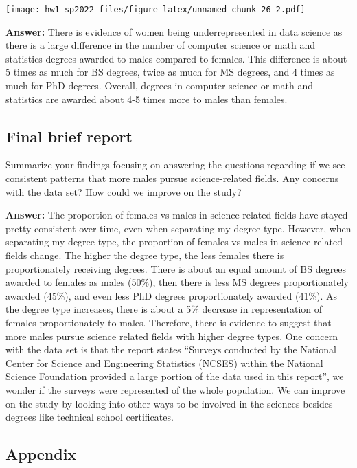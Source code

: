 \documentclass[
]{article}
\begin{document}
\texttt{[image: hw1\_sp2022\_files/figure-latex/unnamed-chunk-26-2.pdf]}

\textbf{Answer:} There is evidence of women being underrepresented in
data science as there is a large difference in the number of computer
science or math and statistics degrees awarded to males compared to
females. This difference is about 5 times as much for BS degrees, twice
as much for MS degrees, and 4 times as much for PhD degrees. Overall,
degrees in computer science or math and statistics are awarded about 4-5
times more to males than females.

\hypertarget{final-brief-report}{%
\subsection{Final brief report}\label{final-brief-report}}

Summarize your findings focusing on answering the questions regarding if
we see consistent patterns that more males pursue science-related
fields. Any concerns with the data set? How could we improve on the
study?

\textbf{Answer:} The proportion of females vs males in science-related
fields have stayed pretty consistent over time, even when separating my
degree type. However, when separating my degree type, the proportion of
females vs males in science-related fields change. The higher the degree
type, the less females there is proportionately receiving degrees. There
is about an equal amount of BS degrees awarded to females as males
(50\%), then there is less MS degrees proportionately awarded (45\%),
and even less PhD degrees proportionately awarded (41\%). As the degree
type increases, there is about a 5\% decrease in representation of
females proportionately to males. Therefore, there is evidence to
suggest that more males pursue science related fields with higher degree
types. One concern with the data set is that the report states ``Surveys
conducted by the National Center for Science and Engineering Statistics
(NCSES) within the National Science Foundation provided a large portion
of the data used in this report'', we wonder if the surveys were
represented of the whole population. We can improve on the study by
looking into other ways to be involved in the sciences besides degrees
like technical school certificates.

\hypertarget{appendix}{%
\subsection{Appendix}\label{appendix}}
\end{document}
